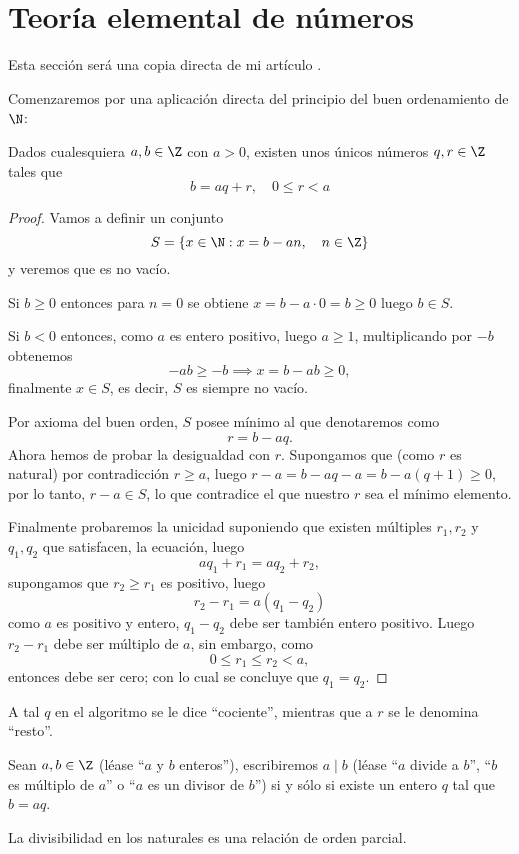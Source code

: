 \documentclass[11pt,oneside]{book}
\begin{document}
\section{Teoría elemental de números}
Esta sección será una copia directa de mi artículo \cite{hohlen2019teoria}.

Comenzaremos por una aplicación directa del principio del buen ordenamiento de $\N$:
\begin{thm}
Dados cualesquiera $a,b\in\Z$ con $a\gt 0$, existen unos únicos números $q,r\in\Z$ tales que
$$b=aq+r,\quad 0\leq r\lt a$$
\end{thm}
\begin{proof}
Vamos a definir un conjunto
$$S=\{x\in\N:x=b-an,\quad n\in\Z\}$$
y veremos que es no vacío.

Si $b\geq 0$ entonces para $n=0$ se obtiene $x=b-a\cdot 0=b\geq 0$ luego $b\in S$.

Si $b\lt 0$ entonces, como $a$ es entero positivo, luego $a\geq 1$, multiplicando por $-b$ obtenemos
$$-ab\geq -b\implies x=b-ab\geq 0,$$
finalmente $x\in S$, es decir, $S$ es siempre no vacío.

Por axioma del buen orden, $S$ posee mínimo al que denotaremos como
$$r=b-aq.$$
Ahora hemos de probar la desigualdad con $r$. Supongamos que (como $r$ es natural) por contradicción $r\geq a$, luego $r-a=b-aq-a=b-a(q+1)\geq 0$, por lo tanto, $r-a\in S$, lo que contradice el que nuestro $r$ sea el mínimo elemento.

Finalmente probaremos la unicidad suponiendo que existen múltiples $r_1,r_2$ y $q_1,q_2$ que satisfacen, la ecuación, luego
$$aq_1+r_1=aq_2+r_2,$$
supongamos que $r_2\geq r_1$ es positivo, luego
$$r_2-r_1=a(q_1-q_2)$$
como $a$ es positivo y entero, $q_1-q_2$ debe ser también entero positivo. Luego $r_2-r_1$ debe ser múltiplo de $a$, sin embargo, como
$$0\leq r_1\leq r_2\lt a,$$
entonces debe ser cero; con lo cual se concluye que $q_1=q_2$.
\end{proof}
A tal $q$ en el algoritmo se le dice ``cociente'', mientras que a $r$ se le denomina ``resto''.
\begin{mydef}[Divisibilidad]
Sean $a,b\in\Z$ (léase ``$a$ y $b$ enteros''), escribiremos $a\mid b$  (léase ``$a$ divide a $b$'', ``$b$ es múltiplo de $a$'' o ``$a$ es un divisor de $b$'') si y sólo si existe un entero $q$ tal que $b=aq$.
\end{mydef}
\begin{thm}
La divisibilidad en los naturales es una relación de orden parcial.
\end{thm}
\end{document}

